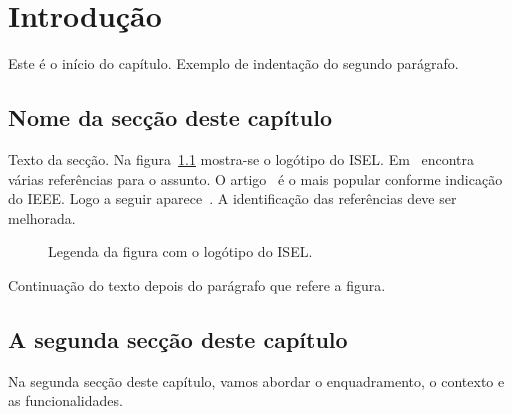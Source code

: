 %
%
\chapter{Introdução}\label{ch:introducao}

Este é o início do capítulo.
Exemplo de indentação do segundo parágrafo.

%
%


\section{Nome da secção deste capítulo} \label{sec11}

Texto da secção. Na figura~\ref{fig:logotipo} mostra-se o logótipo do ISEL. Em~\cite{wiki:bigdata2019} encontra várias referências para o assunto. O artigo~\cite{6547630} é o mais popular conforme indicação do IEEE. Logo a seguir aparece~\cite{6824752}. A identificação das referências deve ser melhorada.

\begin{figure}[h]
    \begin{center}
    \end{center}
    \caption{Legenda da figura com o logótipo do ISEL.}\label{fig:logotipo}
\end{figure}

Continuação do texto depois do parágrafo que refere a figura.

%
%


\section{A segunda secção deste capítulo} \label{sec12}
Na segunda secção deste capítulo, vamos abordar o enquadramento,
o contexto e as funcionalidades.

